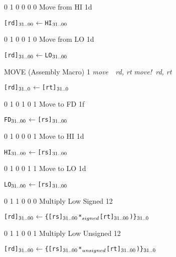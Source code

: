       {0 1 0 0 0 0} {Move from HI}   {1d}   {\RawTag}
\begin{alltt}
        [rd]\({\sb{31..00}}\) \(\leftarrow\)  HI\({\sb{31..00}}\)
\end{alltt}\rawInstrEnd

      {0 1 0 0 1 0} {Move from LO}   {1d}   {\RawTag}
\begin{alltt}
        [rd]\({\sb{31..00}}\) \(\leftarrow\)  LO\({\sb{31..00}}\)
\end{alltt}\rawInstrEnd

       {MOVE (Assembly Macro)} {1} {\MIPSTag} {{\em move~~rd, rt}} {{\em move!~rd, rt}}
\begin{alltt}
        [rd]\(\sb{31..0}\)  \(\leftarrow\) [rt]\(\sb{31..0}\)
\end{alltt}\rawInstrEnd


      {0 1 0 1 0 1} {Move to FD}   {1f}   {\RawTag}
\begin{alltt}
        FD\({\sb{31..00}}\) \(\leftarrow\) [rs]\({\sb{31..00}}\)
\end{alltt}\rawInstrEnd

      {0 1 0 0 0 1} {Move to HI}   {1d}   {\RawTag}
\begin{alltt}
        HI\({\sb{31..00}}\) \(\leftarrow\) [rs]\({\sb{31..00}}\)
\end{alltt}\rawInstrEnd

      {0 1 0 0 1 1} {Move to LO}   {1d}   {\RawTag}
\begin{alltt}
        LO\({\sb{31..00}}\) \(\leftarrow\) [rs]\({\sb{31..00}}\)
\end{alltt}\rawInstrEnd

  {0 1 1 0 0 0}    {Multiply Low Signed}             {1}{2}    {\RawTag}
\begin{alltt}
        [rd]\({\sb{31..00}}\) \(\leftarrow\) \{ [rs]\({\sb{31..00}}\) *\({\sb{signed}}\) [rt]\({\sb{31..00}}\)) \}\(\sb{31..0}\)
\end{alltt}\rawInstrEnd

  {0 1 1 0 0 1}    {Multiply Low Unsigned}             {1}{2}    {\RawTag}
\begin{alltt}
        [rd]\({\sb{31..00}}\) \(\leftarrow\) \{ [rs]\({\sb{31..00}}\) *\({\sb{unsigned}}\) [rt]\({\sb{31..00}}\)) \}\(\sb{31..0}\)
\end{alltt}\rawInstrEnd

